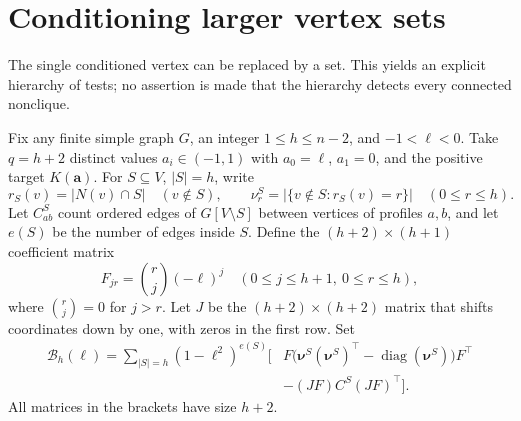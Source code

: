 \documentclass[11pt]{article}
\theoremstyle{remark}
\DeclareMathOperator{\diag}{diag}
\begin{document}
\section{Conditioning larger vertex sets}
The single conditioned vertex can be replaced by a set. This yields
an explicit hierarchy of tests; no assertion is made that the
hierarchy detects every connected nonclique.

Fix any finite simple graph $G$, an integer $1\leq h\leq n-2$, and
$-1<\ell<0$. Take $q=h+2$ distinct values $a_i\in(-1,1)$ with
$a_0=\ell$, $a_1=0$, and the positive target $K(\mathbf a)$.
For $S\subseteq V$, $|S|=h$, write
\[
 r_S(v)=|N(v)\cap S|\quad(v\notin S),\qquad
 \nu^S_r=|\{v\notin S:r_S(v)=r\}|\quad(0\leq r\leq h).
\]
Let $C^S_{ab}$ count ordered edges of $G[V\setminus S]$ between
vertices of profiles $a,b$, and let $e(S)$ be the number of edges
inside $S$. Define the $(h+2)\times(h+1)$ coefficient matrix
\[
 F_{jr}=\binom rj(-\ell)^j\quad
 (0\leq j\leq h+1,\ 0\leq r\leq h),
\]
where $\binom rj=0$ for $j>r$.
Let $J$ be the $(h+2)\times(h+2)$ matrix that shifts coordinates
down by one, with zeros in the first row. Set
\begin{equation}
 \begin{split}
 \mathcal B_h(\ell)=\sum_{|S|=h}(1-\ell^2)^{e(S)}
 \bigl[&F\bigl(\boldsymbol\nu^S(\boldsymbol\nu^S)^\top
                    -\diag(\boldsymbol\nu^S)\bigr)F^\top\\
       &-(JF)C^S(JF)^\top\bigr].
 \end{split}                                           \label{eq:hierarchyB}
\end{equation}
All matrices in the brackets have size $h+2$.
\end{document}
